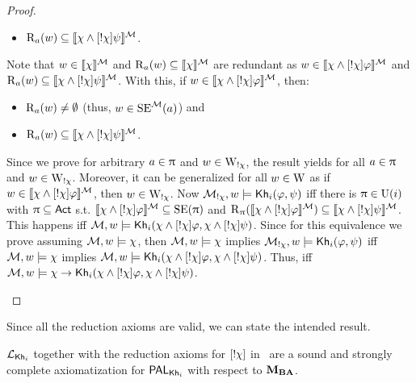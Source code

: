 \begin{proof}
\begin{itemize}
\begin{itemize}
		\item $\operatorname{R}_a(w) \subseteq \llbracket \chi \wedge [!\chi]\psi \rrbracket^{\mathcal{M}}$.
	\end{itemize}
	Note that $w \in \llbracket \chi \rrbracket^{\mathcal{M}}$ and $\operatorname{R}_a(w) \subseteq \llbracket \chi \rrbracket^{\mathcal{M}}$ are redundant as $w \in \llbracket \chi \wedge [!\chi]\varphi \rrbracket^{\mathcal{M}}$ and $\operatorname{R}_a(w) \subseteq \llbracket \chi \wedge [!\chi]\psi \rrbracket^{\mathcal{M}}$.
	With this, if $w \in \llbracket \chi \wedge [!\chi]\varphi \rrbracket^{\mathcal{M}}$, then:
	\begin{itemize}
		\item $\operatorname{R}_a(w) \neq \emptyset$ (thus, $w \in \operatorname{SE}^{\mathcal{M}}(a)$) and
		\item $\operatorname{R}_a(w) \subseteq \llbracket \chi \wedge [!\chi]\psi \rrbracket^{\mathcal{M}}$.
	\end{itemize}
	Since we prove for arbitrary $a \in \uppi$ and $w \in \operatorname{W}_{!\chi}$, the result yields for all $a \in \uppi$ and $w \in \operatorname{W}_{!\chi}$.
	Moreover, it can be generalized for all $w \in \operatorname{W}$ as if $w \in \llbracket \chi \wedge [!\chi]\varphi \rrbracket^{\mathcal{M}}$, then $w \in \operatorname{W}_{!\chi}$.
	Now $\mathcal{M}_{!\chi},w \models {\sf Kh}_i(\varphi,\psi)$ iff there is $\uppi \in \operatorname{U}(i)$ with $\uppi \subseteq {\rm \sf Act}$ s.t. $\llbracket \chi \wedge [!\chi]\varphi \rrbracket^{\mathcal{M}} \subseteq \operatorname{SE}(\uppi)$ and $\operatorname{R}_\uppi(\llbracket \chi \wedge [!\chi]\varphi \rrbracket^{\mathcal{M}}) \subseteq \llbracket \chi \wedge [!\chi]\psi \rrbracket^{\mathcal{M}}$.
	This happens iff $\mathcal{M},w \models {\sf Kh}_i(\chi \wedge [!\chi]\varphi,\chi \wedge [!\chi]\psi)$. Since for this equivalence we prove assuming $\mathcal{M},w \models \chi$, then $\mathcal{M},w \models \chi$ implies $\mathcal{M}_{!\chi},w \models {\sf Kh}_i(\varphi,\psi)$ iff $\mathcal{M},w \models \chi$ implies $\mathcal{M},w \models {\sf Kh}_i(\chi \wedge [!\chi]\varphi,\chi \wedge [!\chi]\psi)$. Thus, iff $\mathcal{M},w \models \chi \rightarrow {\sf Kh}_i(\chi \wedge [!\chi]\varphi,\chi \wedge [!\chi]\psi)$.
	\end{itemize}
	\end{proof}
	
	

Since all the reduction axioms are valid, we can state the intended result. 

\medskip 

\begin{theorem}\label{th:palcomplete}
$\mathcal{L}_{{\sf Kh}_i}$ together with the reduction axioms for $[!\chi]$ in~ are a sound and strongly complete axiomatization for $\mathsf{PAL}_{{\sf Kh}_i}$ with respect to $\mathbf{M}_{\mathbf{BA}}$.
\end{theorem}

